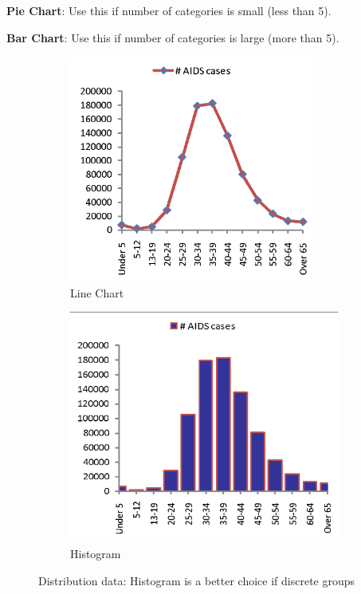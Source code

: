 \documentclass[11pt,fleqn]{book} %
\begin{document}
\begin{example}
\begin{example}
  \textbf{Pie Chart}: Use this if number of categories is small (less than 5).

  \textbf{Bar Chart}: Use this if number of categories is large (more than 5).

  \begin{figure}[hibt!]
    \centering
    \begin{subfigure}[c]{0.45\linewidth}
        \includegraphics[width=\linewidth]{Pictures/aids-line.png}
        \caption{Line Chart}
        \label{fig:aids-line}
    \end{subfigure}
    \hfill
    \begin{subfigure}[c]{0.45\linewidth}
        \includegraphics[width=\linewidth]{Pictures/aids-histogram.png}
        \caption{Histogram}
        \label{fig:aids-histogram}
    \end{subfigure}
    \caption{Distribution data: Histogram is a better choice
    if discrete groups}
    \label{fig:aids-distribution}
  \end{figure}
\end{example}


\end{example}
\end{document}
